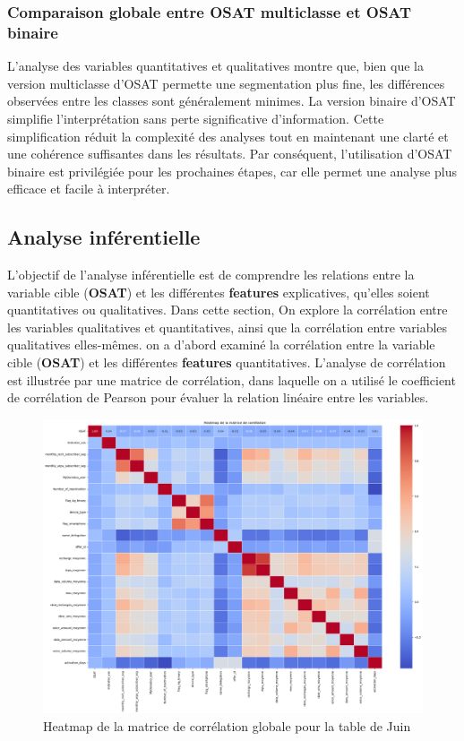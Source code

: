 \subsubsection{Comparaison globale entre OSAT multiclasse et OSAT binaire}
L'analyse des variables quantitatives et qualitatives montre que, bien que la version multiclasse d'OSAT permette une segmentation plus fine, les différences observées entre les classes sont généralement minimes. La version binaire d'OSAT simplifie l'interprétation sans perte significative d'information. Cette simplification réduit la complexité des analyses tout en maintenant une clarté et une cohérence suffisantes dans les résultats. Par conséquent, l'utilisation d'OSAT binaire est privilégiée pour les prochaines étapes, car elle permet une analyse plus efficace et facile à interpréter.


\subsection{Analyse inférentielle}

L'objectif de l'analyse inférentielle est de comprendre les relations entre la variable cible (\textbf{OSAT}) et les différentes \textbf{features} explicatives, qu'elles soient quantitatives ou qualitatives. Dans cette section, On explore la corrélation entre les variables qualitatives et quantitatives, ainsi que la corrélation entre variables qualitatives elles-mêmes.
on a d'abord examiné la corrélation entre la variable cible (\textbf{OSAT}) et les différentes \textbf{features} quantitatives. L'analyse de corrélation est illustrée par une matrice de corrélation, dans laquelle on a utilisé le coefficient de corrélation de Pearson pour évaluer la relation linéaire entre les variables.
\begin{figure}[H]
    \centering
    \includegraphics[width=0.9\linewidth]{Correlation_Retail.png}
    \caption{Heatmap de la matrice de corrélation globale pour la table de Juin}
    \label{fig:correlation_matrix}
\end{figure}

